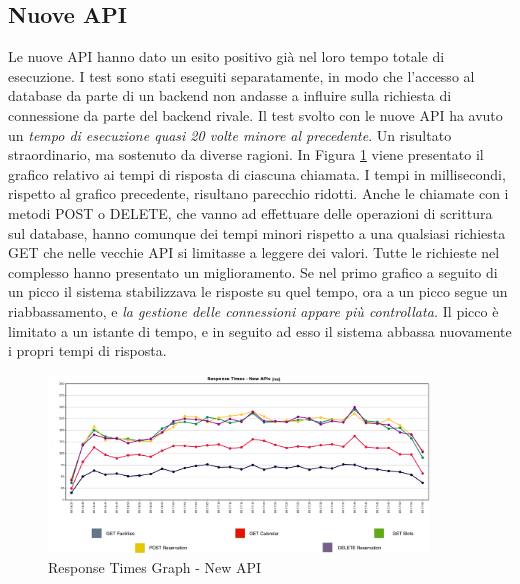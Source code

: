 \subsection{Nuove API}
Le nuove API hanno dato un esito positivo già nel loro tempo totale di esecuzione. I test sono stati eseguiti separatamente, in modo che l'accesso al database da parte di un backend non andasse a influire sulla richiesta di connessione da parte del backend rivale. Il test svolto con le nuove API ha avuto un \emph{tempo di esecuzione quasi 20 volte minore al precedente}. Un risultato straordinario, ma sostenuto da diverse ragioni. In Figura \ref{fig:newapi100t_response} viene presentato il grafico relativo ai tempi di risposta di ciascuna chiamata. I tempi in millisecondi, rispetto al grafico precedente, risultano parecchio ridotti. Anche le chiamate con i metodi POST o DELETE, che vanno ad effettuare delle operazioni di scrittura sul database, hanno comunque dei tempi minori rispetto a una qualsiasi richiesta GET che nelle vecchie API si limitasse a leggere dei valori. Tutte le richieste nel complesso hanno presentato un miglioramento. Se nel primo grafico a seguito di un picco il sistema stabilizzava le risposte su quel tempo, ora a un picco segue un riabbassamento, e \emph{la gestione delle connessioni appare più controllata.} Il picco è limitato a un istante di tempo, e in seguito ad esso il sistema abbassa nuovamente i propri tempi di risposta.
\begin{figure}
    \centering
    \includegraphics[width=0.90\textwidth]{images/04_2_new_api_response_graph_legend.pdf}
    \caption{Response Times Graph - New API}
    \label{fig:newapi100t_response}
\end{figure}
